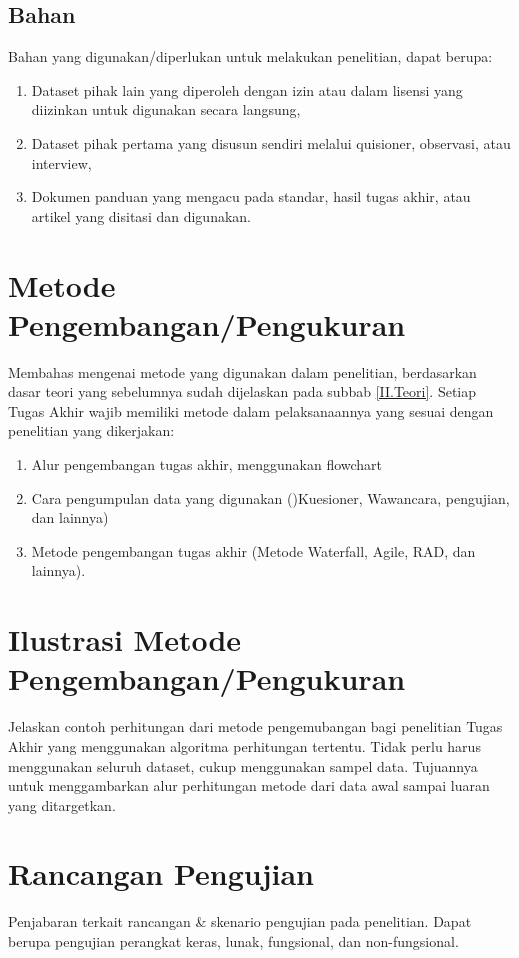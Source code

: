 \subsection{Bahan} \label{III.Bahan}
Bahan yang digunakan/diperlukan untuk melakukan penelitian, dapat berupa: \par
\begin{enumerate}[noitemsep]
	\item Dataset pihak lain yang diperoleh dengan izin atau dalam lisensi yang diizinkan untuk digunakan secara langsung,
	\item Dataset pihak pertama yang disusun sendiri melalui quisioner, observasi, atau interview,
	\item Dokumen panduan yang mengacu pada standar, hasil tugas akhir, atau artikel yang disitasi dan digunakan. 
\end{enumerate}

\section{Metode Pengembangan/Pengukuran} \label{III.Metode}
Membahas mengenai metode yang digunakan dalam penelitian, berdasarkan dasar teori yang sebelumnya sudah dijelaskan pada subbab \ref{II.Teori}. Setiap Tugas Akhir wajib memiliki metode dalam pelaksanaannya yang sesuai dengan penelitian yang dikerjakan: \par
\begin{enumerate}[noitemsep]
	\item Alur pengembangan tugas akhir, menggunakan flowchart
	\item Cara pengumpulan data yang digunakan ()Kuesioner, Wawancara, pengujian, dan lainnya)
	\item Metode pengembangan tugas akhir (Metode Waterfall, Agile, RAD, dan lainnya).
\end{enumerate}

\section{Ilustrasi Metode Pengembangan/Pengukuran} \label{III.Ilustrasi}
Jelaskan contoh perhitungan dari metode pengemubangan bagi penelitian Tugas Akhir yang menggunakan algoritma perhitungan tertentu. Tidak perlu harus menggunakan seluruh dataset, cukup menggunakan sampel data. Tujuannya untuk menggambarkan alur perhitungan metode dari data awal sampai luaran yang ditargetkan. \par

\section{Rancangan Pengujian} \label{III.Rancang Uji}
Penjabaran terkait rancangan \& skenario pengujian pada penelitian. Dapat berupa pengujian perangkat keras, lunak, fungsional, dan non-fungsional.